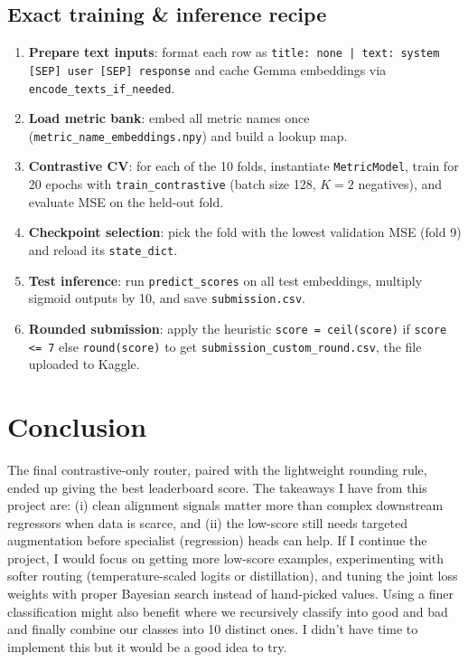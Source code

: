 \documentclass[11pt]{article}
\begin{document}
\subsection{Exact training \& inference recipe}
\begin{enumerate}
  \item \textbf{Prepare text inputs}: format each row as \texttt{title: none | text: system [SEP] user [SEP] response} and cache Gemma embeddings via \texttt{encode\_texts\_if\_needed}.
  \item \textbf{Load metric bank}: embed all metric names once (\texttt{metric\_name\_embeddings.npy}) and build a lookup map.
  \item \textbf{Contrastive CV}: for each of the 10 folds, instantiate \texttt{MetricModel}, train for 20 epochs with \texttt{train\_contrastive} (batch size 128, \(K=2\) negatives), and evaluate MSE on the held-out fold.
  \item \textbf{Checkpoint selection}: pick the fold with the lowest validation MSE (fold 9) and reload its \texttt{state\_dict}.
  \item \textbf{Test inference}: run \texttt{predict\_scores} on all test embeddings, multiply sigmoid outputs by 10, and save \texttt{submission.csv}.
  \item \textbf{Rounded submission}: apply the heuristic \texttt{score = ceil(score)} if \texttt{score <= 7} else \texttt{round(score)} to get \texttt{submission\_custom\_round.csv}, the file uploaded to Kaggle.
\end{enumerate}

\newpage
\section{Conclusion}
\label{sec:conclusion}
The final contrastive-only router, paired with the lightweight rounding rule, ended up giving the best leaderboard score. The takeaways I have from this project are: (i) clean alignment signals matter more than complex downstream regressors when data is scarce, and (ii) the low-score still needs targeted augmentation before specialist (regression) heads can help. If I continue the project, I would focus on getting more low-score examples, experimenting with softer routing (temperature-scaled logits or distillation), and tuning the joint loss weights with proper Bayesian search instead of hand-picked values. Using a finer classification might also benefit where we recursively classify into good and bad and finally combine our classes into 10 distinct ones. I didn't have time to implement this but it would be a good idea to try.
\end{document}

